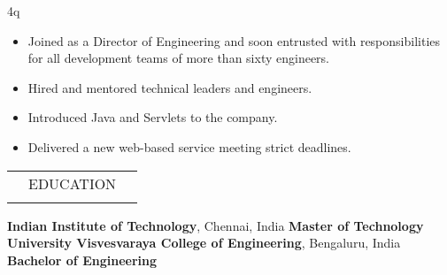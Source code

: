4q\documentclass[a4paper, 13pt,line]{article}
\begin{document}
\begin{itemize}
\item Joined as a Director of Engineering and soon entrusted with
responsibilities for all development teams of more than sixty engineers.
\item Hired and mentored technical leaders and engineers.
\item Introduced Java and Servlets to the company.
\item Delivered a new web-based service meeting strict deadlines.
\end{itemize}

\begin{table}[H]
{\renewcommand{\arraystretch}{1.9}
\begin{tabularx}{\textwidth}{XcX}
\hline\hline\Xhline{2.5\arrayrulewidth}
\rowcolor{Gray}      &EDUCATION& \\
\Xhline{2.5\arrayrulewidth}
\hline
\end{tabularx}
}
\end{table}

\noindent\textbf{Indian Institute of Technology}, Chennai, India \hfill \textbf{Master of Technology}\vspace{1mm}\\
\textbf{University Visvesvaraya College of Engineering}, Bengaluru, India \hfill \textbf{Bachelor of Engineering}\vspace{-1.5mm}\\%
\end{document}
